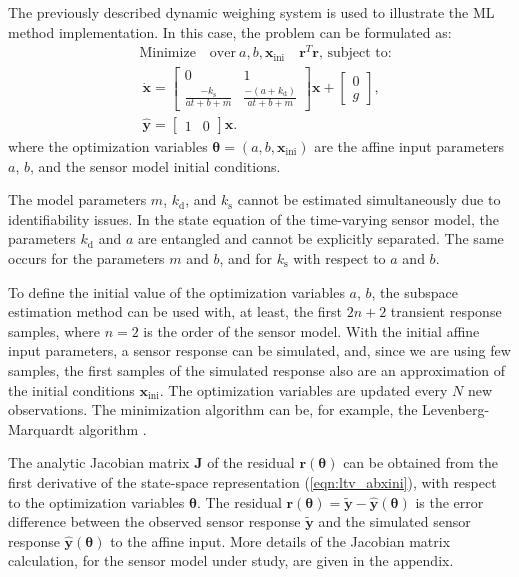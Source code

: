 The previously described dynamic weighing system is used to illustrate the ML method implementation.
In this case, the problem can be formulated as: 
 \begin{equation} \begin{aligned}
     & \text{Minimize} \quad \text{over} \ a, b, \mathbf{x}_{\text{ini}} \quad \mathbf{r}^T \mathbf{r} \text{, subject to:} \\ & \ \dot{\mathbf{x}} = \begin{bmatrix} 0 & 1 \\ \frac{-k_{\mathrm{s}}}{a t + b + m} & \frac{-(a + k_{\mathrm{d}})}{a t + b + m} \end{bmatrix} \mathbf{x} + \begin{bmatrix} 0 \\ g \end{bmatrix}, \\ & \ \widehat{\mathbf{y}} = \begin{bmatrix} 1 & 0  \end{bmatrix} \mathbf{x} .  
 \label{eqn:ltv_abxini} \end{aligned} \end{equation}
where the optimization variables $\bm{\theta} = \left(a, b, \mathbf{x}_{\mathrm{ini}} \right)$ are the affine input parameters $a$, $b$, and the sensor model initial conditions.

The model parameters $m$, $k_{\mathrm{d}}$, and $k_{\mathrm{s}}$ cannot be estimated simultaneously due to identifiability issues.
In the state equation of the time-varying sensor model, the parameters $k_{\mathrm{d}}$ and $a$ are entangled and cannot be explicitly separated.
The same occurs for the parameters $m$ and $b$, and for $k_{\mathrm{s}}$ with respect to $a$ and $b$.

To define the initial value of the optimization variables $a$, $b$,
the subspace estimation method can be used with, at least, the first $2n+2$ transient response samples, where $n=2$ is the order of the sensor model.
With the initial affine input parameters, a sensor response can be simulated, and, since we are using few samples, the first samples of the simulated response also are an approximation of the initial conditions $\mathbf{x}_{\mathrm{ini}}$.
The optimization variables are updated every $N$ new observations.
The minimization algorithm can be, for example, the Levenberg-Marquardt algorithm \citep{Nocedal06}. 

The analytic Jacobian matrix $\mathbf{J}$ of the residual $\mathbf{r}(\bm{\theta})$ can be obtained from the first derivative of the state-space representation (\ref{eqn:ltv_abxini}), with respect to the optimization variables $\bm{\theta}$. 
The residual $\mathbf{r}(\bm{\theta}) = \widetilde{\mathbf{y}} - \widehat{\mathbf{y}}(\bm{\theta})$ is the error difference between the observed sensor response $\widetilde{\mathbf{y}}$ and the simulated sensor response $\widehat{\mathbf{y}}(\bm{\theta})$ to the affine input. 
More details of the Jacobian matrix calculation, for the sensor model under study, are given in the appendix.


